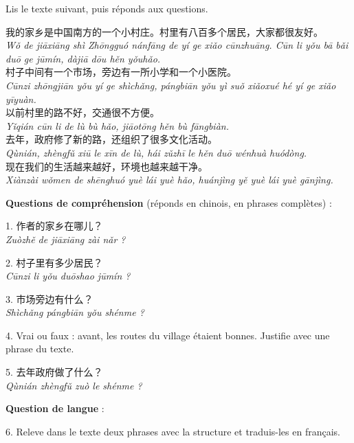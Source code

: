 \documentclass[11pt]{article}
\newcommand{\zh}[1]{\ifmmode\text{#1}\else{#1}\fi}
\begin{document}
\begin{exercice}
Lis le texte suivant, puis réponds aux questions.

\begin{textebox}[我的家乡]
我的家乡是中国南方的一个小村庄。村里有八百多个居民，大家都很友好。\\
\emph{Wǒ de jiāxiāng shì Zhōngguó nánfāng de yí ge xiǎo cūnzhuāng. Cūn li yǒu bā bǎi duō ge jūmín, dàjiā dōu hěn yǒuhǎo.}\\
村子中间有一个市场，旁边有一所小学和一个小医院。\\
\emph{Cūnzi zhōngjiān yǒu yí ge shìchǎng, pángbiān yǒu yì suǒ xiǎoxué hé yí ge xiǎo yīyuàn.}\\
以前村里的路不好，交通很不方便。\\
\emph{Yǐqián cūn li de lù bù hǎo, jiāotōng hěn bù fāngbiàn.}\\
去年，政府修了新的路，还组织了很多文化活动。\\
\emph{Qùnián, zhèngfǔ xiū le xīn de lù, hái zǔzhī le hěn duō wénhuà huódòng.}\\
现在我们的生活越来越好，环境也越来越干净。\\
\emph{Xiànzài wǒmen de shēnghuó yuè lái yuè hǎo, huánjìng yě yuè lái yuè gānjìng.}
\end{textebox}

\textbf{Questions de compréhension} (réponds en chinois, en phrases complètes) :

1. 作者的家乡在哪儿？\\
\emph{Zuòzhě de jiāxiāng zài nǎr ?}

2. 村子里有多少居民？\\
\emph{Cūnzi li yǒu duōshao jūmín ?}

3. 市场旁边有什么？\\
\emph{Shìchǎng pángbiān yǒu shénme ?}

4. Vrai ou faux : avant, les routes du village étaient bonnes. Justifie avec une phrase du texte.

5. 去年政府做了什么？\\
\emph{Qùnián zhèngfǔ zuò le shénme ?}

\textbf{Question de langue} :

6. Releve dans le texte deux phrases avec la structure \zh{越来越} et traduis-les en français.
\end{exercice}
\end{document}
